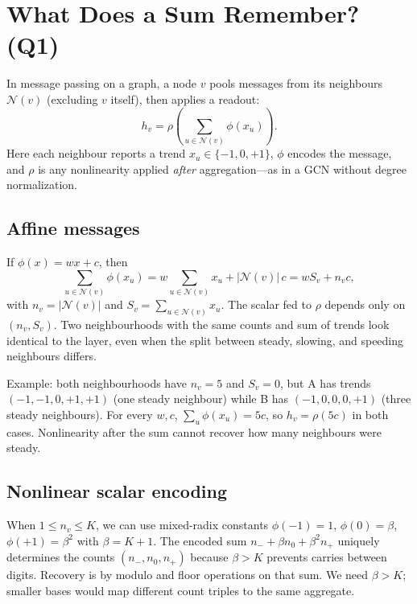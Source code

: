
\section{What Does a Sum Remember? (Q1)}

In message passing on a graph, a node $v$ pools messages from its neighbours $\mathcal{N}(v)$ (excluding $v$ itself), then applies a readout:
\begin{equation}
  h_v = \rho\!\left(\sum_{u \in \mathcal{N}(v)} \phi(x_u)\right).
\end{equation}
Here each neighbour reports a trend $x_u \in \{-1,0,+1\}$, $\phi$ encodes the message, and $\rho$ is any nonlinearity applied \emph{after} aggregation---as in a GCN without degree normalization.

\subsection{Affine messages}

If $\phi(x) = wx + c$, then
\[
  \sum_{u \in \mathcal{N}(v)} \phi(x_u)
  = w \sum_{u \in \mathcal{N}(v)} x_u + |\mathcal{N}(v)|\,c
  = w S_v + n_v c,
\]
with $n_v = |\mathcal{N}(v)|$ and $S_v = \sum_{u \in \mathcal{N}(v)} x_u$.
The scalar fed to $\rho$ depends only on $(n_v, S_v)$.
Two neighbourhoods with the same counts and sum of trends look identical to the layer, even when the split between steady, slowing, and speeding neighbours differs.

Example: both neighbourhoods have $n_v=5$ and $S_v=0$, but A has trends $(-1,-1,0,+1,+1)$ (one steady neighbour) while B has $(-1,0,0,0,+1)$ (three steady neighbours).
For every $w,c$, $\sum_u \phi(x_u) = 5c$, so $h_v = \rho(5c)$ in both cases.
Nonlinearity after the sum cannot recover how many neighbours were steady.

\subsection{Nonlinear scalar encoding}

When $1 \le n_v \le K$, we can use mixed-radix constants $\phi(-1)=1$, $\phi(0)=\beta$, $\phi(+1)=\beta^2$ with $\beta = K+1$.
The encoded sum $n_- + \beta n_0 + \beta^2 n_+$ uniquely determines the counts $(n_-, n_0, n_+)$ because $\beta > K$ prevents carries between digits.
Recovery is by modulo and floor operations on that sum.
We need $\beta > K$; smaller bases would map different count triples to the same aggregate.

